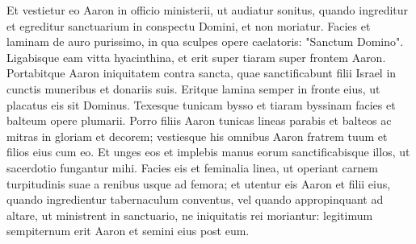 \begin{biblechapter}
\begin{biblechapter}
\begin{biblechapter}
\begin{biblechapter}
\begin{biblechapter}
\begin{biblechapter}
\begin{biblechapter}
\begin{biblechapter}
\begin{biblechapter}
\begin{biblechapter}
\begin{biblechapter}
\begin{biblechapter}
\begin{biblechapter}
\begin{biblechapter}
\begin{biblechapter}
\begin{biblechapter}
\begin{biblechapter}
\begin{biblechapter}
\begin{biblechapter}
\begin{biblechapter}
\begin{biblechapter}
\begin{biblechapter}
\begin{biblechapter}
\begin{biblechapter}
\begin{biblechapter}
\begin{biblechapter}
\begin{biblechapter}
\begin{biblechapter}
\verse Et vestietur eo Aaron in officio ministerii, ut audiatur sonitus, quando ingreditur et egreditur sanctuarium in conspectu Domini, et non moriatur.
 \verse Facies et laminam de auro purissimo, in qua sculpes opere caelatoris: "Sanctum Domino". 
\verse Ligabisque eam vitta hyacinthina, et erit super tiaram 
 \verse super frontem Aaron. Portabitque Aaron iniquitatem contra sancta, quae sanctificabunt filii Israel in cunctis muneribus et donariis suis. Eritque lamina semper in fronte eius, ut placatus eis sit Dominus.
 \verse Texesque tunicam bysso et tiaram byssinam facies et balteum opere plumarii.
 \verse Porro filiis Aaron tunicas lineas parabis et balteos ac mitras in gloriam et decorem; 
\verse vestiesque his omnibus Aaron fratrem tuum et filios eius cum eo. Et unges eos et implebis manus eorum sanctificabisque illos, ut sacerdotio fungantur mihi. 
\verse Facies eis et feminalia linea, ut operiant carnem turpitudinis suae a renibus usque ad femora; 
\verse et utentur eis Aaron et filii eius, quando ingredientur tabernaculum conventus, vel quando appropinquant ad altare, ut ministrent in sanctuario, ne iniquitatis rei moriantur: legitimum sempiternum erit Aaron et semini eius post eum.
 

\end{biblechapter}
\end{biblechapter}
\end{biblechapter}
\end{biblechapter}
\end{biblechapter}
\end{biblechapter}
\end{biblechapter}
\end{biblechapter}
\end{biblechapter}
\end{biblechapter}
\end{biblechapter}
\end{biblechapter}
\end{biblechapter}
\end{biblechapter}
\end{biblechapter}
\end{biblechapter}
\end{biblechapter}
\end{biblechapter}
\end{biblechapter}
\end{biblechapter}
\end{biblechapter}
\end{biblechapter}
\end{biblechapter}
\end{biblechapter}
\end{biblechapter}
\end{biblechapter}
\end{biblechapter}
\end{biblechapter}

